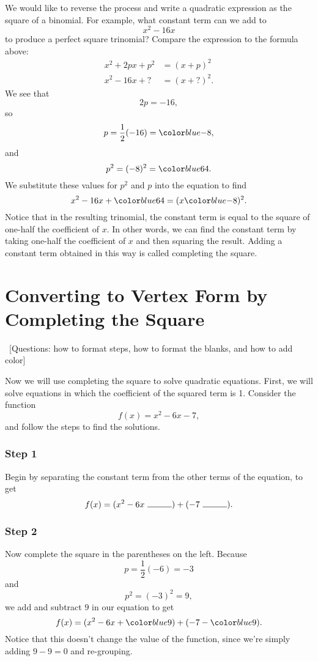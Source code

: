 \documentclass{ximera}
\begin{document}
   
   

We would like to reverse the process and write a quadratic expression as the square of a binomial. For example, what constant term can we add to
$$
    x^2 - 16x
$$
to produce a perfect square trinomial? Compare the expression to the formula above:
\begin{align*}
    x^2 + 2px + p^2 &= (x+p)^2 \\
    x^2 - 16x + ? &= (x + ?)^2.
\end{align*}   
We see that   
$$
    2p = -16,
$$
so
$$
    p = \frac{1}{2}(-16) = \substitute{-8},
$$
and 
$$
    p^2 = (-8)^2 = \substitute{64}.
$$   
We substitute these values for $p^2$ and $p$ into the equation to find
$$
    x^2 - 16 x + \substitute{64} = (x \substitute{- 8})^2.
$$
Notice that in the resulting trinomial, the constant term is equal to the square of one-half the coefficient of $x$. In other words, we can find the constant term by taking one-half the coefficient of $x$ and then squaring the result. Adding a constant term obtained in this way is called completing the square.   


\section{Converting to Vertex Form by Completing the Square}

~[Questions: how to format steps, how to format the blanks, and how to add color]

Now we will use completing the square to solve quadratic equations. First, we will solve equations in which the coefficient of the squared term is 1. Consider the function
$$
    f(x) = x^2 - 6x - 7,
$$
and follow the steps to find the solutions.

\subsubsection{Step 1}
Begin by separating the constant term from the other terms of the equation, to get
$$
    f(x) = (x^2 - 6x\ \rule{1cm}{0.15mm}) + (-7\ \rule{1cm}{0.15mm}).
$$

\subsubsection{Step 2}
Now complete the square in the parentheses on the left. Because
$$
    p = \frac{1}{2}(-6) = -3
$$
and
$$
    p^2 = (-3)^2 = 9,
$$
we add and subtract $9$ in our equation to get
$$
    f(x) = (x^2-6x+\substitute{9}) + (-7 - \substitute{9}).
$$
Notice that this doesn't change the value of the function, since we're simply adding $9 - 9 = 0$ and re-grouping.
\end{document}
